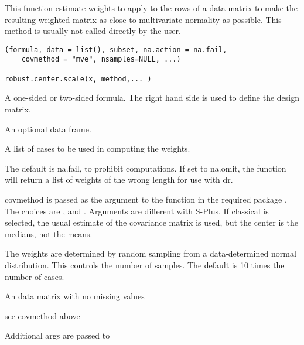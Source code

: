 \begin{Description}\relax
This function estimate weights to apply to the rows of a data matrix to
make the resulting weighted matrix as close to multivariate normality as
possible.  This method is usually not called directly by the user.
\end{Description}
\begin{Usage}
\begin{verbatim}
(formula, data = list(), subset, na.action = na.fail, 
    covmethod = "mve", nsamples=NULL, ...) 

robust.center.scale(x, method,... )
\end{verbatim}
\end{Usage}
\begin{Arguments}
\begin{ldescription}
\item[\code{formula}] A one-sided or two-sided formula.  The right hand side is used
to define the design matrix.
\item[\code{data}] An optional data frame.
\item[\code{subset}] A list of cases to be used in computing the weights.
\item[\code{na.action}] The default is na.fail, to prohibit computations.  If set to
na.omit, the function will return a list of weights of the wrong length for use
with dr.
\item[\code{covmethod}] covmethod is passed as the argument  
to the function  in the required package
.  The choices are ,
 and .  Arguments are different with S-Plus.
If classical is selected, the usual estimate of the covariance matrix is
used, but the center is the medians, not the means.
\item[\code{nsamples}] The weights are determined by random sampling from a
data-determined normal distribution.  This controls the number of samples.  The
default is 10 times the number of cases.
\item[\code{x}] An  data matrix with no missing values
\item[\code{method}] see covmethod above
\item[\code{...}] Additional args are passed to 
\end{ldescription}
\end{Arguments}
